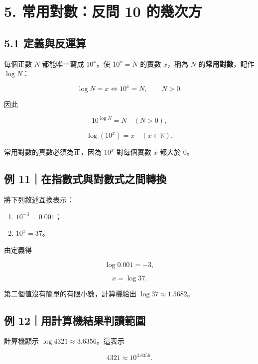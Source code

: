 \documentclass[11pt,a4paper]{article}
\providecommand{\tightlist}{%
  \setlength{\itemsep}{0pt}\setlength{\parskip}{0pt}}
\begin{document}
\section{5. 常用對數：反問 10 的幾次方}\label{ux5e38ux7528ux5c0dux6578ux53cdux554f-10-ux7684ux5e7eux6b21ux65b9}

\subsection{5.1 定義與反運算}\label{ux5b9aux7fa9ux8207ux53cdux904bux7b97}

每個正數 \(N\) 都能唯一寫成 \(10^x\)。使 \(10^x=N\) 的實數 \(x\)，稱為 \(N\) 的\textbf{常用對數}，記作 \(\log N\)：

\[
\boxed{\log N=x\iff10^x=N},\qquad N>0.
\]

因此

\[
\boxed{10^{\log N}=N}\quad(N>0),
\]

\[
\boxed{\log(10^x)=x}\quad(x\in\mathbb R).
\]

常用對數的真數必須為正，因為 \(10^x\) 對每個實數 \(x\) 都大於 \(0\)。

\subsection{例 11｜在指數式與對數式之間轉換}\label{ux4f8b-11ux5728ux6307ux6578ux5f0fux8207ux5c0dux6578ux5f0fux4e4bux9593ux8f49ux63db}

將下列敘述互換表示：

\begin{enumerate}
\def\labelenumi{\arabic{enumi}.}
\tightlist
\item
  \(10^{-3}=0.001\)；
\item
  \(10^x=37\)。
\end{enumerate}

由定義得

\[
\boxed{\log0.001=-3},
\]

\[
\boxed{x=\log37}.
\]

第二個值沒有簡單的有限小數，計算機給出 \(\log37\approx1.5682\)。

\subsection{例 12｜用計算機結果判讀範圍}\label{ux4f8b-12ux7528ux8a08ux7b97ux6a5fux7d50ux679cux5224ux8b80ux7bc4ux570d}

計算機顯示 \(\log4321\approx3.6356\)。這表示

\[
4321\approx10^{3.6356}.
\]
\end{document}

